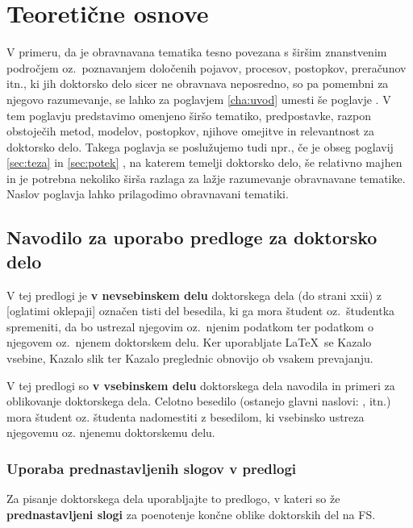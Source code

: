 \chapter{Teoretične osnove}\label{cha:teoreticne_osnove}


V primeru, da je obravnavana tematika tesno povezana s širšim znanstvenim področjem oz.\ poznavanjem določenih pojavov, procesov, postopkov, preračunov itn., ki jih doktorsko delo sicer ne obravnava neposredno, so pa pomembni za njegovo razumevanje, se lahko za poglavjem \ref{cha:uvod}  umesti še poglavje . V tem poglavju predstavimo omenjeno širšo tematiko, predpostavke, razpon obstoječih metod, modelov, postopkov, njihove omejitve in relevantnost za doktorsko delo. Takega poglavja se poslužujemo tudi npr., če je obseg poglavij \ref{sec:teza}  in \ref{sec:potek} , na katerem temelji doktorsko delo, še relativno majhen in je potrebna nekoliko širša razlaga za lažje razumevanje obravnavane tematike. Naslov poglavja lahko prilagodimo obravnavani tematiki.
\section{Navodilo za uporabo predloge za doktorsko delo}\label{sec:uporaba_predloge}
V tej predlogi je \textbf{v nevsebinskem delu} doktorskega dela (do strani xxii) z [oglatimi oklepaji] označen tisti del besedila, ki ga mora študent oz.\ študentka spremeniti, da bo ustrezal njegovim oz.\ njenim podatkom ter podatkom o njegovem oz.\ njenem doktorskem delu. Ker uporabljate \LaTeX~se Kazalo vsebine, Kazalo slik ter Kazalo preglednic obnovijo ob vsakem prevajanju.

V tej predlogi so \textbf{v vsebinskem delu} doktorskega dela navodila in primeri za oblikovanje doktorskega dela. Celotno besedilo (ostanejo glavni naslovi: ,  itn.) mora študent oz. študenta nadomestiti z besedilom, ki vsebinsko ustreza njegovemu oz. njenemu doktorskemu delu.

\subsection{Uporaba prednastavljenih slogov v predlogi}\label{sec:prednastavitve}
Za pisanje doktorskega dela uporabljajte to predlogo, v kateri so že \textbf{prednastavljeni slogi} za poenotenje končne oblike doktorskih del na FS.

